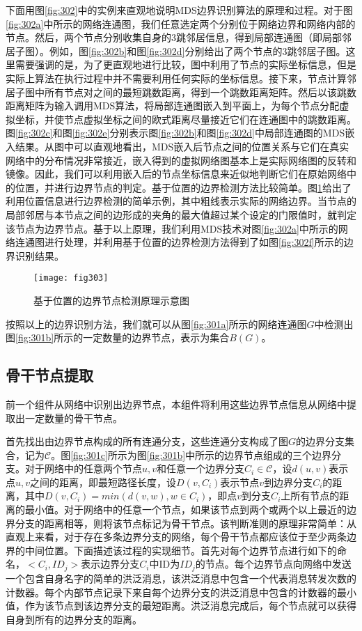 下面用图\ref{fig:302}中的实例来直观地说明MDS边界识别算法的原理和过程。对于图\ref{fig:302a}中所示的网络连通图，我们任意选定两个分别位于网络边界和网络内部的节点。然后，两个节点分别收集自身的3跳邻居信息，得到局部连通图（即局部邻居子图）。例如，图\ref{fig:302b}和图\ref{fig:302d}分别给出了两个节点的3跳邻居子图。这里需要强调的是，为了更直观地进行比较，图中利用了节点的实际坐标信息，但是实际上算法在执行过程中并不需要利用任何实际的坐标信息。接下来，节点计算邻居子图中所有节点对之间的最短跳数距离，得到一个跳数距离矩阵。然后以该跳数距离矩阵为输入调用MDS算法，将局部连通图嵌入到平面上，为每个节点分配虚拟坐标，并使节点虚拟坐标之间的欧式距离尽量接近它们在连通图中的跳数距离。图\ref{fig:302c}和图\ref{fig:302e}分别表示图\ref{fig:302b}和图\ref{fig:302d}中局部连通图的MDS嵌入结果。从图中可以直观地看出，MDS嵌入后节点之间的位置关系与它们在真实网络中的分布情况非常接近，嵌入得到的虚拟网络图基本上是实际网络图的反转和镜像。因此，我们可以利用嵌入后的节点坐标信息来近似地判断它们在原始网络中的位置，并进行边界节点的判定。基于位置的边界检测方法比较简单。图\ref{fig:303}给出了利用位置信息进行边界检测的简单示例，其中粗线表示实际的网络边界。当节点的局部邻居与本节点之间的边形成的夹角的最大值超过某个设定的门限值时，就判定该节点为边界节点。基于以上原理，我们利用MDS技术对图\ref{fig:302a}中所示的网络连通图进行处理，并利用基于位置的边界检测方法得到了如图\ref{fig:302f}所示的边界识别结果。
\begin{figure}[h]
  \centering
  \texttt{[image: fig303]}
  \caption{基于位置的边界节点检测原理示意图}
  \label{fig:303}
\end{figure}

按照以上的边界识别方法，我们就可以从图\ref{fig:301a}所示的网络连通图$G$中检测出图\ref{fig:301b}所示的一定数量的边界节点，表示为集合$B(G)$。
\subsection{骨干节点提取}
前一个组件从网络中识别出边界节点，本组件将利用这些边界节点信息从网络中提取出一定数量的骨干节点。

首先找出由边界节点构成的所有连通分支，这些连通分支构成了图$G$的边界分支集合，记为$\mathcal{C}$。图\ref{fig:301c}所示为图\ref{fig:301b}中所示的边界节点组成的三个边界分支。对于网络中的任意两个节点$u,v$和任意一个边界分支$C_i\in{\mathcal{C}}$，设$d(u,v)$表示点$u,v$之间的距离，即最短路径长度，设$D(v,C_i)$表示节点$v$到边界分支$C_i$的距离，其中$D(v,C_i)=min(d(v,w),w\in{C_i})$，即点$v$到分支$C_i$上所有节点的距离的最小值。对于网络中的任意一个节点，如果该节点到两个或两个以上最近的边界分支的距离相等，则将该节点标记为骨干节点。该判断准则的原理非常简单：从直观上来看，对于存在多条边界分支的网络，每个骨干节点都应该位于至少两条边界的中间位置。下面描述该过程的实现细节。首先对每个边界节点进行如下的命名，$<C_i,ID_j>$表示边界分支$C_i$中ID为$ID_j$的节点。每个边界节点向网络中发送一个包含自身名字的简单的洪泛消息，该洪泛消息中包含一个代表消息转发次数的计数器。每个内部节点记录下来自每个边界分支的洪泛消息中包含的计数器的最小值，作为该节点到该边界分支的最短距离。洪泛消息完成后，每个节点就可以获得自身到所有的边界分支的距离。

